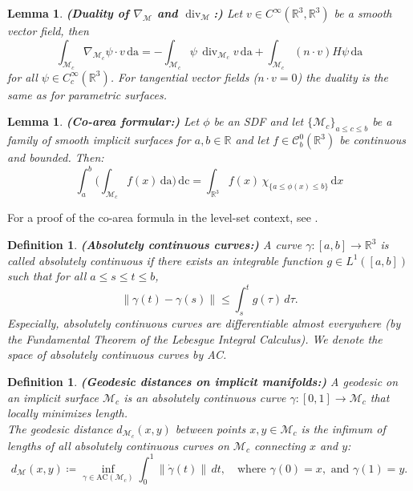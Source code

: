 \documentclass[12pt,openany]{book}
\newcommand{\R}{\mathbb{R}}
\theoremstyle{plainnormal}
\newtheorem{lemma}[theorem]{Lemma}
\newtheorem{definition}[theorem]{Definition}
\theoremstyle{remark}
\begin{document}
\begin{lemma}\textbf{(Duality of $\nabla_\mathcal{M}$ and $\operatorname{div}_\mathcal{M}$:)}
    Let 
    \(v \in C^\infty(\mathbb{R}^3, \mathbb{R}^3)\) be a smooth vector field, then
    $$\int_{\mathcal{M}_c}\nabla_{\mathcal{M}_c} \psi \cdot v\,\mathrm{da}= -\int_{\mathcal{M}_c}\psi\, \operatorname{div}_{\mathcal{M}_c} v\,\mathrm{da}+ \int_{\mathcal{M}_c }(n\cdot v) H\psi\, \mathrm{da}
    $$
    for all $\psi\in C_c^\infty(\R^3)$. 
    For tangential vector fields ($n\cdot v = 0$) the duality is the same as for parametric surfaces. 
\end{lemma}

\begin{lemma}\label{Co_Area_form}\textbf{(Co-area formular:)} Let $\phi$ be an SDF and let $\{\mathcal{M}_c\}_{a\leq c \leq b }$ be a family of smooth implicit surfaces for $a,b \in \R$ and let $f\in \mathcal{C}^0_b(\R^3)$ be continuous and bounded. Then:
$$\int_a^b\Big(\int_{\mathcal{M}_c} f(x) \,\mathrm{da}\Big) \,\mathrm{dc} = \int_{\R^3} f(x)\, \chi_{\{a\leq \phi(x)\leq b\}}\,\mathrm{d}x$$
\end{lemma}
For a proof of the co-area formula in the level-set context, see \cite{evans}. 
\begin{definition}\textbf{(Absolutely continuous curves:)}
    A curve \(\gamma : [a,b] \to \mathbb{R}^3\) is called \emph{absolutely continuous} if there exists an integrable function \(g \in L^1([a,b])\) such that for all \(a \leq s \leq t \leq b\),
\[
\|\gamma(t) - \gamma(s)\| \leq \int_s^t g(\tau) \, d\tau.
\]
Especially, absolutely continuous curves are differentiable almost everywhere (by the Fundamental Theorem of the Lebesgue Integral Calculus). We denote the space of absolutely continuous curves by AC.
\end{definition}
\begin{definition}\textbf{(Geodesic distances on implicit manifolds:)}
A geodesic on an implicit surface \(\mathcal{M}_c\) is an absolutely continuous curve \(\gamma : [0,1] \to \mathcal{M}_c\) that locally minimizes length. \\The geodesic distance \(d_{\mathcal{M}_c}(x,y)\) between points \(x,y \in \mathcal{M}_c\) is the infimum of lengths of all absolutely continuous curves on \(\mathcal{M}_c\) connecting \(x\) and \(y\):
\[
d_{\mathcal{M}}(x,y) \coloneqq \inf_{\gamma \in \text{AC}(\mathcal M_c)} \int_0^1 \|\dot{\gamma}(t)\| \, dt, \quad \text{where } \gamma(0) = x, \text{ and } \gamma(1) = y.
\]
\end{definition}
\let\cleardoublepage\clearpage
\end{document}
